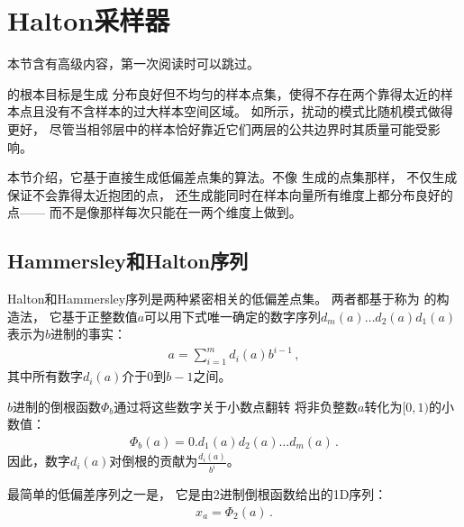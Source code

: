 \section{Halton采样器}\label{sec:Halton采样器}
\begin{remark}
    本节含有高级内容，第一次阅读时可以跳过。
\end{remark}

的根本目标是生成
分布良好但不均匀的样本点集，使得不存在两个靠得太近的样本点且没有不含样本的过大样本空间区域。
如所示，扰动的模式比随机模式做得更好，
尽管当相邻层中的样本恰好靠近它们两层的公共边界时其质量可能受影响。

本节介绍，它基于直接生成低偏差点集的算法。不像\linebreak
{}生成的点集那样，
不仅生成保证不会靠得太近抱团的点，
还生成能同时在样本向量所有维度上都分布良好的点——
而不是像那样每次只能在一两个维度上做到。

\subsection{Hammersley和Halton序列}\label{sub:Hammersley和Halton序列}
Halton和Hammersley序列是两种紧密相关的低偏差点集。
两者都基于称为
的构造法，
它基于正整数值$a$可以用下式唯一确定的数字序列$d_m(a)\ldots d_2(a)d_1(a)$
表示为$b$进制的事实：
\begin{align}
    \label{eq:7.6}
    a=\sum\limits_{i=1}^m{d_i(a)b^{i-1}}\, ,
\end{align}
其中所有数字$d_i(a)$介于0到$b-1$之间。

$b$进制的倒根函数$\Phi_b$通过将这些数字关于小数点翻转
将非负整数$a$转化为$[0,1)$的小数值：
\begin{align}
    \label{eq:7.7}
    \Phi_b(a)=0.d_1(a)d_2(a)\ldots d_m(a)\, .
\end{align}
因此，数字$d_i(a)$对倒根的贡献为$\displaystyle\frac{d_i(a)}{b^i}$。

最简单的低偏差序列之一是，
它是由2进制倒根函数给出的1D序列：
\begin{align*}
    x_a=\Phi_2(a)\, .
\end{align*}

